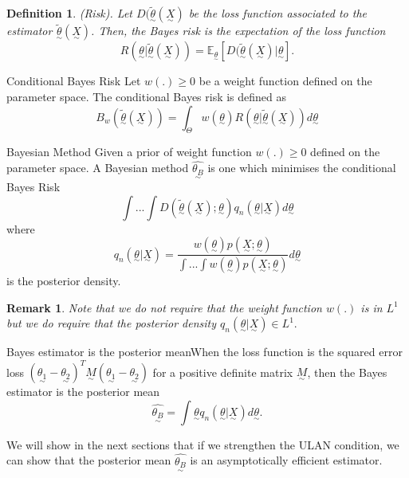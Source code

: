 \documentclass[twoside]{article}
\newtheorem{definition}[theorem]{Definition}
\newtheorem{remark}[theorem]{Remark}
\newcommand{\utilde}{\underset{\sim}}
\begin{document}
\begin{definition}(Risk). Let $D(\tilde{\utilde{\theta}}(\utilde{X})$ be the loss function associated to the estimator $\tilde{\utilde{\theta}}(\utilde{X})$. Then, the Bayes risk is the expectation of the loss function 
$$
R(\utilde{\theta}|\tilde{\utilde{\theta}}(\utilde{X})) = \mathbb{E}_{\utilde{\theta}}[D(\tilde{\utilde{\theta}}(\utilde{X})|\utilde{\theta}].
$$
\end{definition}

\begin{definition_exam}{Conditional Bayes Risk}{} Let $w(.) \geq 0$ be a weight function defined on the parameter space. The conditional Bayes risk is defined as 
$$
B_w(\tilde{\utilde{\theta}}(\utilde{X})) = \int_{\Theta}w(\utilde{\theta})R(\utilde{\theta}|\tilde{\utilde{\theta}}(\utilde{X}))d\utilde{\theta}
$$
\end{definition_exam}

\newpage
\begin{definition_exam}{Bayesian Method}{} Given a prior of weight function $w(.) \geq 0$ defined on the parameter space. A Bayesian method $\hat{\utilde{\theta_B}}$ is one which minimises the conditional Bayes Risk
$$
\int ... \int D(\tilde{\utilde{\theta}}(\utilde{X}); \utilde{\theta})q_n(\utilde{\theta}|\utilde{X})d\utilde{\theta}
$$
where $$q_n(\utilde{\theta}|\utilde{X}) = \frac{w(\utilde{\theta})p(\utilde{X};\utilde{\theta})}{\int ... \int w(\utilde{\theta})p(\utilde{X};\utilde{\theta})}d\utilde{\theta}$$ is the posterior density.
\end{definition_exam}
\begin{remark}Note that we do not require that the weight function $w(.)$ is in $L^1$ but we do require that the posterior density $q_n(\utilde{\theta}|\utilde{X}) \in L^1.$
\end{remark}


\begin{proposition_exam}{Bayes estimator is the posterior mean}{}When the loss function is the squared error loss $(\utilde{\theta_1} - \utilde{\theta_2})^T\utilde{M}(\utilde{\theta_1} - \utilde{\theta_2})$ for a positive definite matrix $\utilde{M}$, then the Bayes estimator is the posterior mean 
$$
\hat{\utilde{\theta_B}} = \int \utilde{\theta}q_n(\utilde{\theta}|\utilde{X})d\utilde{\theta}.
$$
\end{proposition_exam}

We will show in the next sections that if we strengthen the ULAN condition, we can show that the posterior mean $\hat{\utilde{\theta_B}}$ is an asymptotically efficient estimator.
\end{document}
